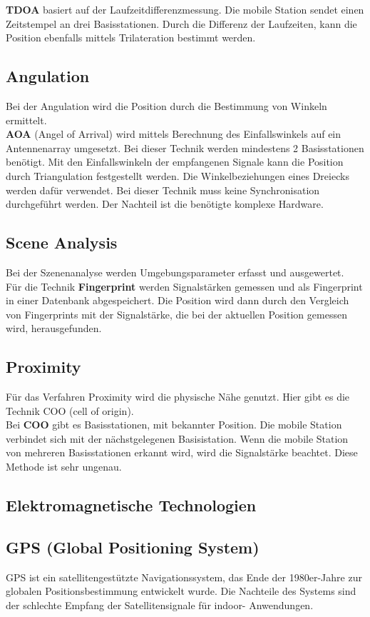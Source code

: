     \textbf{TDOA} basiert auf der Laufzeitdifferenzmessung.
    Die mobile Station sendet einen Zeitstempel an drei Basisstationen. Durch die Differenz der Laufzeiten, kann die Position ebenfalls mittels Trilateration bestimmt werden.

    \subsection*{Angulation}
    Bei der Angulation wird die Position durch die Bestimmung von Winkeln ermittelt. \\
    \textbf{AOA} (Angel of Arrival) wird mittels Berechnung des Einfallswinkels auf ein Antennenarray umgesetzt. Bei dieser Technik werden mindestens 2 Basisstationen benötigt. Mit den Einfallswinkeln der empfangenen Signale kann die Position durch Triangulation festgestellt werden. Die Winkelbeziehungen eines Dreiecks werden dafür verwendet.
    Bei dieser Technik muss keine Synchronisation durchgeführt werden. Der Nachteil ist die benötigte komplexe Hardware.

    \subsection*{Scene Analysis}
    Bei der Szenenanalyse werden Umgebungsparameter erfasst und ausgewertet.\\
    Für die Technik \textbf{Fingerprint} werden Signalstärken gemessen und als Fingerprint in einer Datenbank abgespeichert. Die Position wird dann durch den Vergleich von Fingerprints mit der Signalstärke, die bei der aktuellen Position gemessen wird, herausgefunden.
    \subsection*{Proximity}
    Für das Verfahren Proximity wird die physische Nähe genutzt.
    Hier gibt es die Technik COO (cell of origin). \\
    Bei \textbf{COO} gibt es Basisstationen, mit bekannter Position. Die mobile Station verbindet sich mit der nächstgelegenen Basisistation. Wenn die mobile Station von mehreren Basisstationen erkannt wird, wird die Signalstärke beachtet. Diese Methode ist sehr ungenau.

    \subsection{Elektromagnetische Technologien}
    \subsection*{GPS (Global Positioning System)}
    GPS ist ein satellitengestützte Navigationssystem, das Ende der 1980er-Jahre zur globalen Positionsbestimmung entwickelt wurde. Die Nachteile des Systems sind der schlechte Empfang der Satellitensignale für indoor- Anwendungen.
